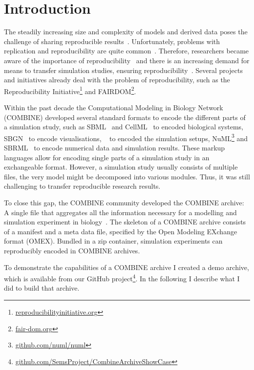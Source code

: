 
\section{Introduction}
\label{sec:intro}

The steadily increasing size and complexity of models and derived data poses the challenge of sharing reproducible results~\cite{scharm2014}.
Unfortunately, problems with replication and reproducibility are quite common~\cite{Prinz2011,repmicro,drugdevprob}.
Therefore, researchers became aware of the importance of reproducibility~\cite{Sandve2013} and
there is an increasing demand for means to transfer simulation studies, ensuring reproducibility~\cite{workflowobjects,researchobjects,Bergmann2014}.
% 
% 
% 
Several projects and initiatives already deal with the problem of reproducibility, such as the Reproducibility Initiative\footnote{\href{http://reproducibilityinitiative.org/}{reproducibilityinitiative.org}} and FAIRDOM\footnote{\href{http://fair-dom.org/}{fair-dom.org}}.

Within the past decade the Computational Modeling in Biology Network (COMBINE) developed several standard formats to encode the different parts of a simulation study, such as SBML~\cite{Hucka2003} and CellML~\cite{Cuellar2003a} to encoded biological systems, SBGN~\cite{sbgn} to encode visualisations, \sedml~\cite{Waltemath2011} to encoded the simulation setups, NuML\footnote{\href{https://github.com/numl/numl}{github.com/numl/numl}} and SBRML~\cite{Dada2010} to encode numerical data and simulation results.
These markup languages allow for encoding single parts of a simulation study in an exchangeable format.
However, a simulation study usually consists of multiple files, the very model might be decomposed into various modules.
Thus, it was still challenging to transfer reproducible research results.

To close this gap, the COMBINE community developed the COMBINE archive:
A single file that aggregates all the information necessary for a modelling and simulation experiment in biology~\cite{Bergmann2014}.
The skeleton of a COMBINE archive consists of a manifest and a meta data file, specified by the Open Modeling EXchange format (OMEX).
Bundled in a zip container, simulation experiments can reproducibly encoded in COMBINE archives.

To demonstrate the capabilities of a COMBINE archive I created a demo archive, which is available from our GitHub project\footnote{\href{https://github.com/SemsProject/CombineArchiveShowCase}{github.com/SemsProject/CombineArchiveShowCase}}.
In the following I describe what I did to build that archive.

